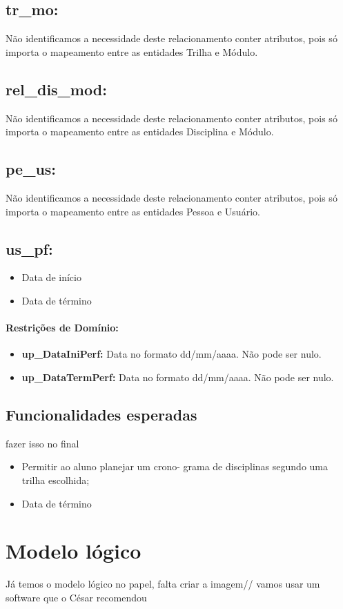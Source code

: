 \documentclass{report}
\begin{document}
\subsection{tr\_mo:}
 Não identificamos a necessidade deste relacionamento conter atributos, pois só
 importa o mapeamento entre as entidades Trilha e Módulo.
\subsection{rel\_dis\_mod:}
 Não identificamos a necessidade deste relacionamento conter atributos, pois só
 importa o mapeamento entre as entidades Disciplina e Módulo.
\subsection{pe\_us:}
Não identificamos a necessidade deste relacionamento conter atributos, pois só
 importa o mapeamento entre as entidades Pessoa e Usuário.
\subsection{us\_pf:}
\begin{itemize}
  \item Data de início
  \item Data de término
\end{itemize}
\paragraph{Restrições de Domínio:}
\begin{itemize}
  \item \textbf{up\_DataIniPerf:} Data no formato dd/mm/aaaa. Não pode ser nulo.
  \item \textbf{up\_DataTermPerf:} Data no formato dd/mm/aaaa. Não pode ser nulo.
\end{itemize}
\subsection{Funcionalidades esperadas}
{\huge fazer isso no final\par}
\begin{itemize}
  \item Permitir ao aluno planejar um crono-
grama de disciplinas segundo uma trilha
escolhida;
  \item Data de término
\end{itemize}
\section{Modelo lógico}
{\huge Já temos o modelo lógico no papel, falta criar a imagem//
vamos usar um software que o César recomendou\par}
\end{document}
